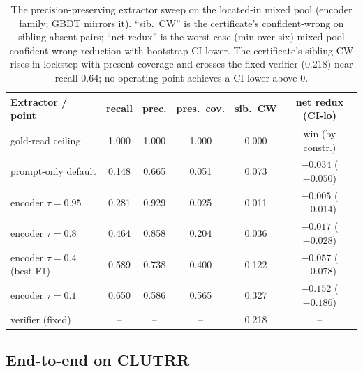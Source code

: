 \documentclass[11pt,letterpaper]{article}
\begin{document}
\begin{table}[t]
\centering
\small
\begin{tabular}{lccccc}
\hline
Extractor / point & recall & prec. & pres.\ cov. & sib.\ CW & net redux (CI-lo) \\
\hline
gold-read ceiling & 1.000 & 1.000 & 1.000 & 0.000 & win (by constr.) \\
prompt-only default & 0.148 & 0.665 & 0.051 & 0.073 & $-0.034$ ($-0.050$) \\
encoder $\tau{=}0.95$ & 0.281 & 0.929 & 0.025 & 0.011 & $-0.005$ ($-0.014$) \\
encoder $\tau{=}0.8$ & 0.464 & 0.858 & 0.204 & 0.036 & $-0.017$ ($-0.028$) \\
encoder $\tau{=}0.4$ (best F1) & 0.589 & 0.738 & 0.400 & 0.122 & $-0.057$ ($-0.078$) \\
encoder $\tau{=}0.1$ & 0.650 & 0.586 & 0.565 & 0.327 & $-0.152$ ($-0.186$) \\
verifier (fixed) & -- & -- & -- & 0.218 & -- \\
\hline
\end{tabular}
\caption{The precision-preserving extractor sweep on the located-in mixed pool (encoder family; GBDT mirrors it). ``sib.\ CW'' is the certificate's confident-wrong on sibling-absent pairs; ``net redux'' is the worst-case (min-over-six) mixed-pool confident-wrong reduction with bootstrap CI-lower. The certificate's sibling CW rises in lockstep with present coverage and crosses the fixed verifier ($0.218$) near recall $0.64$; no operating point achieves a CI-lower above $0$.}
\label{tab:supervised}
\end{table}

\subsection{End-to-end on CLUTRR}
\label{sec:clutrr}
\end{document}

